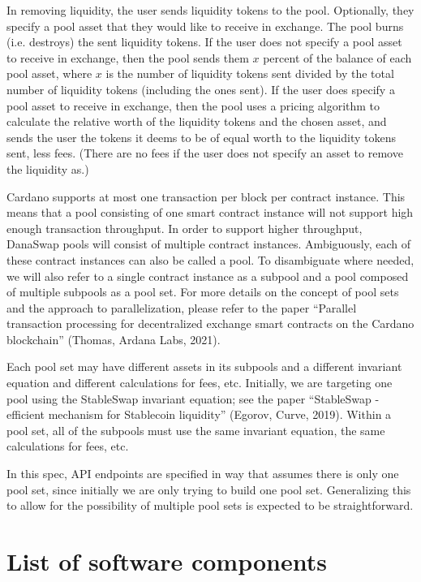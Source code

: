 \documentclass[12pt]{article}
\begin{document}
In removing liquidity, the user sends liquidity tokens to the pool. Optionally, they specify a pool asset that they would like to receive in exchange. The pool burns (i.e. destroys) the sent liquidity tokens. If the user does not specify a pool asset to receive in exchange, then the pool sends them $x$ percent of the balance of each pool asset, where $x$ is the number of liquidity tokens sent divided by the total number of liquidity tokens (including the ones sent). If the user does specify a pool asset to receive in exchange, then the pool uses a pricing algorithm to calculate the relative worth of the liquidity tokens and the chosen asset, and sends the user the tokens it deems to be of equal worth to the liquidity tokens sent, less fees. (There are no fees if the user does not specify an asset to remove the liquidity as.)

Cardano supports at most one transaction per block per contract instance. This means that a pool consisting of one smart contract instance will not support high enough transaction throughput. In order to support higher throughput, DanaSwap pools will consist of multiple contract instances. Ambiguously, each of these contract instances can also be called a pool. To disambiguate where needed, we will also refer to a single contract instance as a subpool and a pool composed of multiple subpools as a pool set. For more details on the concept of pool sets and the approach to parallelization, please refer to the paper ``Parallel transaction processing for decentralized exchange smart contracts on the Cardano blockchain'' (Thomas, Ardana Labs, 2021).

Each pool set may have different assets in its subpools and a different invariant equation and different calculations for fees, etc. Initially, we are targeting one pool using the StableSwap invariant equation; see the paper ``StableSwap - efficient mechanism for Stablecoin liquidity'' (Egorov, Curve, 2019). Within a pool set, all of the subpools must use the same invariant equation, the same calculations for fees, etc.

In this spec, API endpoints are specified in way that assumes there is only one pool set, since initially we are only trying to build one pool set. Generalizing this to allow for the possibility of multiple pool sets is expected to be straightforward.

\section{List of software components}
\end{document}
